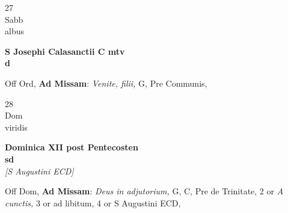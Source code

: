 \documentclass[10pt, openany]{book}
\begin{document}
        \begin{center}
            \begin{minipage}{3.5in}
                \vspace{2em}
                \begin{minipage}{0.5in}
                    {\Huge 27} \\
                    {\normalsize Sabb} \\
                    {\normalsize albus}
                \end{minipage}
                \begin{minipage}{3.0in}
                    \textbf{ \large S Josephi Calasanctii C mtv \\
                    \textnormal{\normalsize d}} \\ 
                \end{minipage}
                \begin{justify}Off Ord, \textbf{Ad Missam}: \textit{Venite, filii,} G, Pre Communis,  
                \end{justify}
            \end{minipage}
        \end{center}
    
        \begin{center}
            \begin{minipage}{3.5in}
                \vspace{2em}
                \begin{minipage}{0.5in}
                    {\Huge 28} \\
                    {\normalsize Dom} \\
                    {\normalsize viridis}
                \end{minipage}
                \begin{minipage}{3.0in}
                    \textbf{ \large Dominica XII post Pentecosten \\
                    \textnormal{\normalsize sd}} \\ \textit{[S Augustini ECD]} \\ 
                \end{minipage}
                \begin{justify}Off Dom, \textbf{Ad Missam}: \textit{Deus in adjutorium,} G, C, Pre de Trinitate, 2 or \textit{A cunctis,} 3 or ad libitum, 4 or S Augustini ECD,  
                \end{justify}
            \end{minipage}
        \end{center}
    
\end{document}
